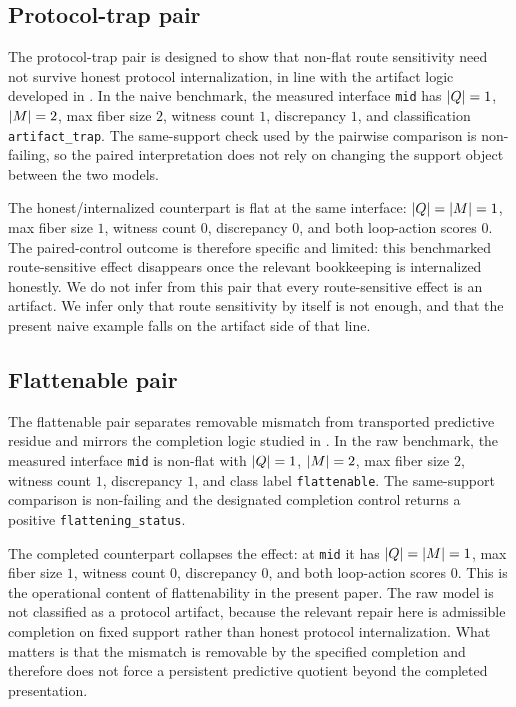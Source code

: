 \documentclass[11pt]{article}
\theoremstyle{definition}
\begin{document}
\subsection{Protocol-trap pair}\label{subsec:bench-protocol-trap}
The protocol-trap pair is designed to show that non-flat route sensitivity need not survive honest protocol internalization, in line with the artifact logic developed in \citep{Tsiokos2026ProtocolTrap}. In the naive benchmark, the measured interface \texttt{mid} has $|Q|=1$, $|M|=2$, max fiber size $2$, witness count $1$, discrepancy $1$, and classification \texttt{artifact\_trap}. The same-support check used by the pairwise comparison is non-failing, so the paired interpretation does not rely on changing the support object between the two models.

The honest/internalized counterpart is flat at the same interface: $|Q|=|M|=1$, max fiber size $1$, witness count $0$, discrepancy $0$, and both loop-action scores $0$. The paired-control outcome is therefore specific and limited: this benchmarked route-sensitive effect disappears once the relevant bookkeeping is internalized honestly. We do not infer from this pair that every route-sensitive effect is an artifact. We infer only that route sensitivity by itself is not enough, and that the present naive example falls on the artifact side of that line.

\subsection{Flattenable pair}\label{subsec:bench-flattenable}
The flattenable pair separates removable mismatch from transported predictive residue and mirrors the completion logic studied in \citep{Tsiokos2026FlattenStone}. In the raw benchmark, the measured interface \texttt{mid} is non-flat with $|Q|=1$, $|M|=2$, max fiber size $2$, witness count $1$, discrepancy $1$, and class label \texttt{flattenable}. The same-support comparison is non-failing and the designated completion control returns a positive \texttt{flattening\_status}.

The completed counterpart collapses the effect: at \texttt{mid} it has $|Q|=|M|=1$, max fiber size $1$, witness count $0$, discrepancy $0$, and both loop-action scores $0$. This is the operational content of flattenability in the present paper. The raw model is not classified as a protocol artifact, because the relevant repair here is admissible completion on fixed support rather than honest protocol internalization. What matters is that the mismatch is removable by the specified completion and therefore does not force a persistent predictive quotient beyond the completed presentation.
\end{document}
